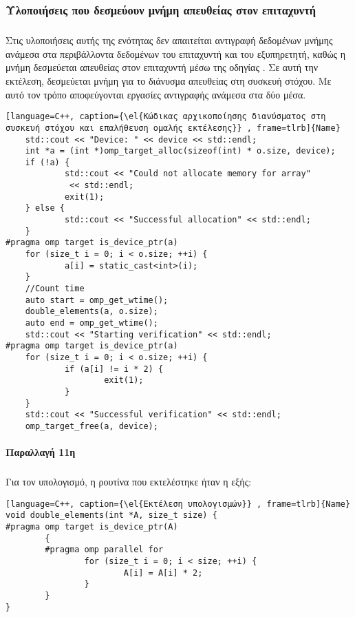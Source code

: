 \newpage
\subsubsection{Υλοποιήσεις που δεσμεύουν μνήμη απευθείας στον επιταχυντή}
\subparagraph{}
Στις υλοποιήσεις αυτής της ενότητας δεν απαιτείται αντιγραφή δεδομένων μνήμης ανάμεσα στα περιβάλλοντα δεδομένων του επιταχυντή και του εξυπηρετητή, καθώς η μνήμη δεσμεύεται απευθείας στον επιταχυντή μέσω της οδηγίας \emph{}. Σε αυτή την εκτέλεση, δεσμεύεται μνήμη για το διάνυσμα απευθείας στη συσκευή στόχου. Με αυτό τον τρόπο αποφεύγονται εργασίες αντιγραφής ανάμεσα στα δύο μέσα.
\ \\
\begin{lstlisting}[language=C++, caption={\el{Κώδικας αρχικοποίησης διανύσματος στη συσκευή στόχου και επαλήθευση ομαλής εκτέλεσης}} , frame=tlrb]{Name}
    std::cout << "Device: " << device << std::endl;
    int *a = (int *)omp_target_alloc(sizeof(int) * o.size, device);
    if (!a) {
            std::cout << "Could not allocate memory for array"
             << std::endl;
            exit(1);
    } else {
            std::cout << "Successful allocation" << std::endl;
    }
#pragma omp target is_device_ptr(a)
    for (size_t i = 0; i < o.size; ++i) {
            a[i] = static_cast<int>(i);
    }
    //Count time
    auto start = omp_get_wtime();
    double_elements(a, o.size);
    auto end = omp_get_wtime();
    std::cout << "Starting verification" << std::endl;
#pragma omp target is_device_ptr(a)
    for (size_t i = 0; i < o.size; ++i) {
            if (a[i] != i * 2) {
                    exit(1);
            }
    }
    std::cout << "Successful verification" << std::endl;
    omp_target_free(a, device);
\end{lstlisting}

\clearpage
\paragraph{Παραλλαγή 11η}
\subparagraph{}
Για τον υπολογισμό, η ρουτίνα που εκτελέστηκε ήταν η εξής:

\begin{lstlisting}[language=C++, caption={\el{Εκτέλεση υπολογισμών}} , frame=tlrb]{Name}
void double_elements(int *A, size_t size) {
#pragma omp target is_device_ptr(A)
        {
        #pragma omp parallel for
                for (size_t i = 0; i < size; ++i) {
                        A[i] = A[i] * 2;
                }
        }
}
\end{lstlisting}

